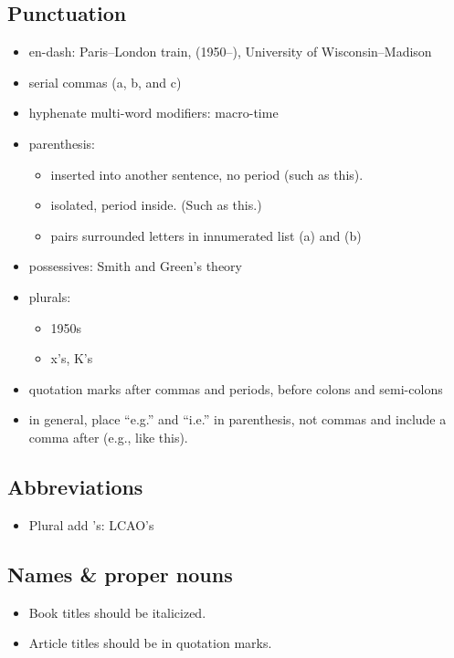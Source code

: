 \documentclass[10pt, letter]{article}
\begin{document}
\begin{multicols}{2}
\subsection{Punctuation}
\label{sec:punctuation}
\begin{itemize}
\item en-dash: Paris--London train, (1950--), University of Wisconsin--Madison
\item serial commas (a, b, and c)
\item hyphenate multi-word modifiers: macro-time
\item parenthesis:
  \begin{itemize}
  \item inserted into another sentence, no period (such as this).
  \item isolated, period inside. (Such as this.)
  \item pairs surrounded letters in innumerated list (a) and (b)
  \end{itemize}
\item possessives: Smith and Green's theory
\item plurals:
  \begin{itemize}
  \item 1950s
  \item x's, K's
  \end{itemize}
\item quotation marks after commas and periods, before colons and
  semi-colons
\item in general, place ``e.g.'' and ``i.e.'' in parenthesis, not
  commas and include a comma after (e.g., like this). 
\end{itemize}

\subsection{Abbreviations}
\label{sec:abbreviations}
\begin{itemize}
\item Plural add 's: LCAO's
\end{itemize}

\subsection{Names \& proper nouns}\label{sec:names}
\begin{itemize}
\item Book titles should be italicized.
\item Article titles should be in quotation marks.
\end{itemize}


\end{multicols}
\end{document}
